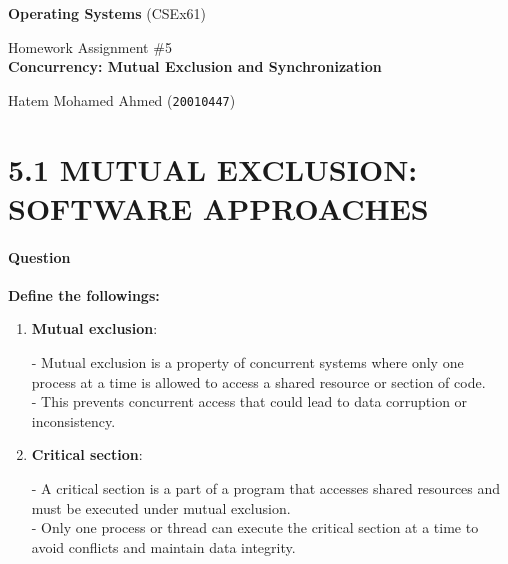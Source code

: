 \documentclass[a4paper,12pt,fleqn]{article}
\newcounter{question}
\newcommand*\question{%
\stepcounter{question}%
\paragraph{Question \thequestion}}
\newcommand{\coursename}{Operating Systems}
\newcommand{\coursecode}{CSEx61}
\newcommand{\assigntype}{Homework Assignment \#5 \\ \textbf{Concurrency: Mutual Exclusion and Synchronization}}
\newcommand{\teacher}{Hatem Mohamed Ahmed (\texttt{20010447})}
\begin{document}
%
%

\noindent\makebox[\linewidth]{\rule{\textwidth}{0.4pt}}

\begin{center}
	\Large \textbf{\coursename} (\coursecode)
\end{center}

\begin{center}
	\large \assigntype{} \\
	\vspace{3mm}
\end{center}

\begin{center}
	\teacher\\
	
\end{center}

\noindent\makebox[\linewidth]{\rule{\textwidth}{0.4pt}}


%
%




\section*{5.1 MUTUAL EXCLUSION: SOFTWARE APPROACHES}
\question \textbf{Define the followings:}
\begin{enumerate}
	\item \textbf{Mutual exclusion}:
	\begin{answer}
		- Mutual exclusion is a property of concurrent systems where only one process at a time is allowed to access a shared resource or section of code. \\
		- This prevents concurrent access that could lead to data corruption or inconsistency.
	\end{answer}
	
	\item \textbf{Critical section}:
	\begin{answer}
		- A critical section is a part of a program that accesses shared resources and must be executed under mutual exclusion. \\
		- Only one process or thread can execute the critical section at a time to avoid conflicts and maintain data integrity.
	\end{answer}
\end{enumerate}
\end{document}

